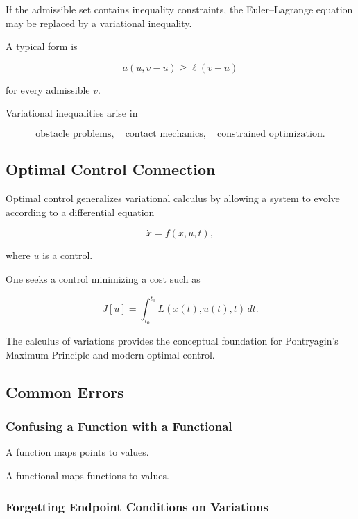 If the admissible set contains inequality constraints, the Euler--Lagrange
equation may be replaced by a variational inequality.

A typical form is

\[
\boxed{
a(u,v-u)
\geq
\ell(v-u)
}
\]

for every admissible \(v\).

Variational inequalities arise in

\[
\boxed{
\text{obstacle problems},
\quad
\text{contact mechanics},
\quad
\text{constrained optimization}.
}
\]

\subsection{Optimal Control Connection}
\label{subsec:variational-optimal-control}

Optimal control generalizes variational calculus by allowing a system to
evolve according to a differential equation

\[
\boxed{
\dot x=f(x,u,t),
}
\]

where \(u\) is a control.

One seeks a control minimizing a cost such as

\[
\boxed{
J[u]
=
\int_{t_0}^{t_1}
L(x(t),u(t),t)\,dt.
}
\]

The calculus of variations provides the conceptual foundation for
Pontryagin's Maximum Principle and modern optimal control.

\subsection{Common Errors}
\label{subsec:calculus-variations-common-errors}

\subsubsection{Confusing a Function with a Functional}

A function maps points to values.

A functional maps functions to values.

\subsubsection{Forgetting Endpoint Conditions on Variations}


